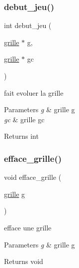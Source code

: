 \subsubsection{\texorpdfstring{debut\+\_\+jeu()}{debut\_jeu()}}
{\footnotesize\ttfamily int debut\+\_\+jeu (\begin{DoxyParamCaption}\item[{\hyperlink{structgrille}{grille} $\ast$}]{g,  }\item[{\hyperlink{structgrille}{grille} $\ast$}]{gc }\end{DoxyParamCaption})\hspace{0.3cm}{\ttfamily [related]}}

fait evoluer la grille


\begin{DoxyParams}{Parameters}
{\em g} & grille g \\
\hline
{\em gc} & grille gc \\
\hline
\end{DoxyParams}
\begin{DoxyReturn}{Returns}
{\ttfamily int} 
\end{DoxyReturn}
\mbox{\label{structgrille_ab36a6f8957cd3e682119007836ce6ad5}} 
\subsubsection{\texorpdfstring{efface\+\_\+grille()}{efface\_grille()}}
{\footnotesize\ttfamily void efface\+\_\+grille (\begin{DoxyParamCaption}\item[{\hyperlink{structgrille}{grille}}]{g }\end{DoxyParamCaption})\hspace{0.3cm}{\ttfamily [related]}}

efface une grille


\begin{DoxyParams}{Parameters}
{\em g} & grille g \\
\hline
\end{DoxyParams}
\begin{DoxyReturn}{Returns}
{\ttfamily void} 
\end{DoxyReturn}
\mbox{\label{structgrille_aac3db82b0f857dc49ccd51628cbc231b}} 
